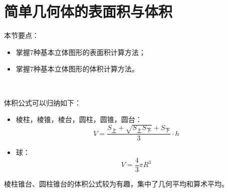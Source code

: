\section{简单几何体的表面积与体积}

本节要点：
\begin{itemize}
    \item 掌握7种基本立体图形的表面积计算方法；
    \item 掌握7种基本立体图形的体积计算方法。
\end{itemize}

~

体积公式可以归纳如下：
\begin{itemize}
    \item 棱柱，棱锥，棱台，圆柱，圆锥，圆台：
    \[
    V=\frac{S_{\text{上}}+\sqrt{S_{\text{上}}S_{\text{下}}}+S_{\text{下}}}{3}\cdot h
    \]
    \item 球：
    \[
    V=\frac{4}{3}\pi R^3
    \]
\end{itemize}

\begin{tcolorbox}
棱柱锥台、圆柱锥台的体积公式较为有趣，集中了几何平均和算术平均。
\end{tcolorbox}




